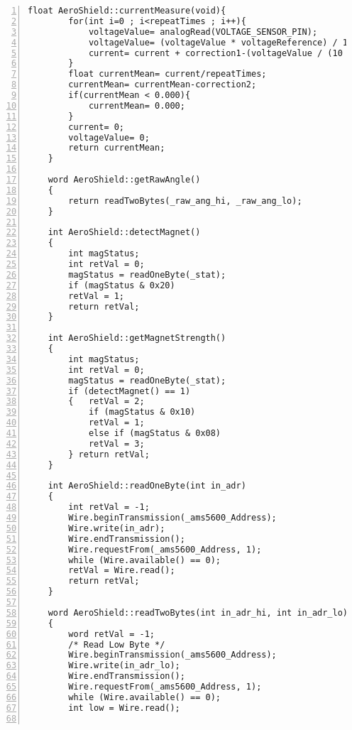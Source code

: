 \begin{lstlisting}[numbers=left,basicstyle=\tiny,caption={Zdrojový kód súboru AeroShield.cpp.},captionpos=b]
	float AeroShield::currentMeasure(void){       
		for(int i=0 ; i<repeatTimes ; i++){                                            
			voltageValue= analogRead(VOLTAGE_SENSOR_PIN);                                       
			voltageValue= (voltageValue * voltageReference) / 1024;                             
			current= current + correction1-(voltageValue / (10 * ShuntRes));     
		}                                                              
		float currentMean= current/repeatTimes;             
		currentMean= currentMean-correction2;              
		if(currentMean < 0.000){                           
			currentMean= 0.000;                             
		}
		current= 0;               
		voltageValue= 0;         
		return currentMean;  
	}
	
	word AeroShield::getRawAngle()                                                           
	{
		return readTwoBytes(_raw_ang_hi, _raw_ang_lo);                                         
	}
	
	int AeroShield::detectMagnet()                                                         
	{
		int magStatus;                                                                   
		int retVal = 0;                                                                      
		magStatus = readOneByte(_stat);                                                                  
		if (magStatus & 0x20)
		retVal = 1;
		return retVal;                                                               
	}
	
	int AeroShield::getMagnetStrength()           
	{
		int magStatus;                                 
		int retVal = 0;                             
		magStatus = readOneByte(_stat);               
		if (detectMagnet() == 1)                         
		{	retVal = 2;                               
			if (magStatus & 0x10)
			retVal = 1;                               
			else if (magStatus & 0x08)
			retVal = 3;                            
		} return retVal;                          
	}
	
	int AeroShield::readOneByte(int in_adr)       
	{
		int retVal = -1;
		Wire.beginTransmission(_ams5600_Address);     
		Wire.write(in_adr);                            
		Wire.endTransmission();                         
		Wire.requestFrom(_ams5600_Address, 1);          
		while (Wire.available() == 0);                   
		retVal = Wire.read();                         
		return retVal;                                   
	}
	
	word AeroShield::readTwoBytes(int in_adr_hi, int in_adr_lo)     
	{
		word retVal = -1;
		/* Read Low Byte */
		Wire.beginTransmission(_ams5600_Address);     
		Wire.write(in_adr_lo);                        
		Wire.endTransmission();                        
		Wire.requestFrom(_ams5600_Address, 1);          
		while (Wire.available() == 0);                  
		int low = Wire.read();                    
		

\end{lstlisting}
